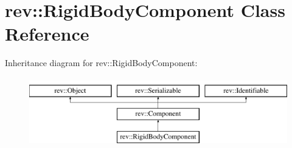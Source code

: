 \hypertarget{classrev_1_1_rigid_body_component}{}\section{rev\+::Rigid\+Body\+Component Class Reference}
\label{classrev_1_1_rigid_body_component}
Inheritance diagram for rev\+::Rigid\+Body\+Component\+:\begin{figure}[H]
\begin{center}
\leavevmode
\includegraphics[height=3.000000cm]{classrev_1_1_rigid_body_component}
\end{center}
\end{figure}

